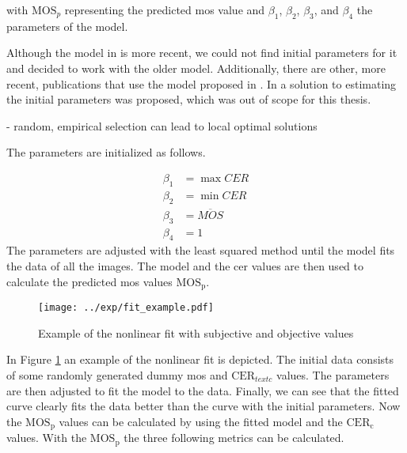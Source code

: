 with $\text{MOS}_{p}$ representing the predicted \gls{mos} value and $\beta_{1}$, $\beta_{2}$, $\beta_{3}$, and $\beta_{4}$ the parameters of the model.

Although the model in \cite{nonlin_fit_original_2003} is more recent, we could not find initial parameters for it and decided to work with the older model.
Additionally, there are other, more recent, publications \cite{ni_esim_2017, nonlin_fit_appl_2017, nonlin_fit_appl_2018, nonlin_fit_appl_2014, nonlin_fit_appl_2011, nonlin_fit_appl_2015, doc_quality_survey_2023, iqa_database_2023, nonlin_fit_appl_2016} that use the model proposed in \cite{nonlin_fit_new_model_2006}.
In \cite{nonlin_fit_init_proof_2017} a solution to estimating the initial parameters was proposed, which was out of scope for this thesis.

- random, empirical selection can lead to local optimal solutions

The parameters are initialized as follows.
 
\begin{equation}
    \begin{aligned}
        \beta_{1} &= \max{CER} \\
        \beta_{2} &= \min{CER} \\
        \beta_{3} &= \overline{MOS} \\
        \beta_{4} &= 1
    \end{aligned}
    \label{eq:nonlinear_init}
\end{equation}
The parameters are adjusted with the least squared method until the model fits the data of all the images.
The model and the \gls{cer} values are then used to calculate the predicted \gls{mos} values $\text{MOS}_{\text{p}}$.

\begin{figure}[h]
    \centering
    \texttt{[image: ../exp/fit\_example.pdf]}
    \caption{Example of the nonlinear fit with subjective and objective values}
    \label{fig:nonlinear_fit}
\end{figure}

In Figure \ref{fig:nonlinear_fit} an example of the nonlinear fit is depicted.
The initial data consists of some randomly generated dummy \gls{mos} and $\text{CER}_{text{c}}$ values.
The parameters are then adjusted to fit the model to the data.
Finally, we can see that the fitted curve clearly fits the data better than the curve with the initial parameters.
Now the $\text{MOS}_{\text{p}}$ values can be calculated by using the fitted model and the $\text{CER}_{\text{c}}$ values.
With the $\text{MOS}_{\text{p}}$ the three following metrics \cite{iqa_survey_2021} can be calculated.

